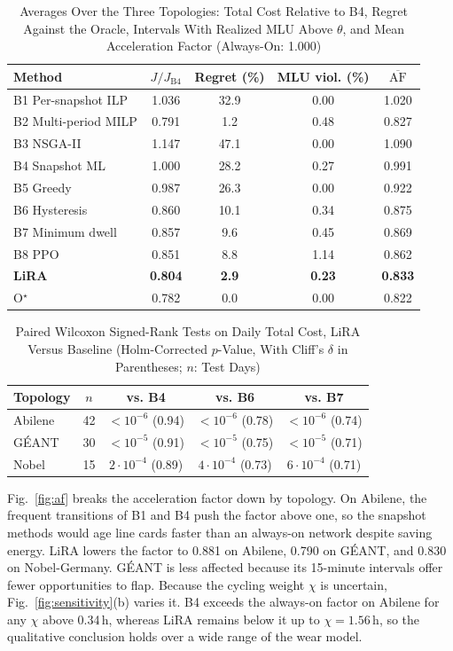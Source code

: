 \documentclass[journal]{IEEEtran}
\begin{document}
\begin{table}[t]
\centering
\caption{Averages Over the Three Topologies: Total Cost Relative to B4, Regret Against the Oracle, Intervals With Realized MLU Above $\theta$, and Mean Acceleration Factor (Always-On: 1.000)}
\label{tab:cost}
\footnotesize
\setlength{\tabcolsep}{4pt}
\begin{tabular}{@{}lcccc@{}}
\toprule
Method & $J/J_{\mathrm{B4}}$ & Regret (\%) & MLU viol. (\%) & $\overline{\mathrm{AF}}$ \\
\midrule
B1 Per-snapshot ILP & 1.036 & 32.9 & 0.00 & 1.020 \\
B2 Multi-period MILP & 0.791 & 1.2 & 0.48 & 0.827 \\
B3 NSGA-II & 1.147 & 47.1 & 0.00 & 1.090 \\
B4 Snapshot ML & 1.000 & 28.2 & 0.27 & 0.991 \\
B5 Greedy & 0.987 & 26.3 & 0.00 & 0.922 \\
B6 Hysteresis & 0.860 & 10.1 & 0.34 & 0.875 \\
B7 Minimum dwell & 0.857 & 9.6 & 0.45 & 0.869 \\
B8 PPO & 0.851 & 8.8 & 1.14 & 0.862 \\
\midrule
\textbf{LiRA} & \textbf{0.804} & \textbf{2.9} & \textbf{0.23} & \textbf{0.833} \\
O$^\star$ & 0.782 & 0.0 & 0.00 & 0.822 \\
\bottomrule
\end{tabular}
\end{table}

\begin{table}[t]
\centering
\caption{Paired Wilcoxon Signed-Rank Tests on Daily Total Cost, LiRA Versus Baseline (Holm-Corrected $p$-Value, With Cliff's $\delta$ in Parentheses; $n$: Test Days)}
\label{tab:stats}
\footnotesize
\setlength{\tabcolsep}{3pt}
\begin{tabular}{@{}lcccc@{}}
\toprule
Topology & $n$ & vs. B4 & vs. B6 & vs. B7 \\
\midrule
Abilene & 42 & $<10^{-6}$ (0.94) & $<10^{-6}$ (0.78) & $<10^{-6}$ (0.74) \\
G\'{E}ANT & 30 & $<10^{-5}$ (0.91) & $<10^{-5}$ (0.75) & $<10^{-5}$ (0.71) \\
Nobel & 15 & $2\cdot10^{-4}$ (0.89) & $4\cdot10^{-4}$ (0.73) & $6\cdot10^{-4}$ (0.71) \\
\bottomrule
\end{tabular}
\end{table}

Fig.~\ref{fig:af} breaks the acceleration factor down by topology. On Abilene, the frequent transitions of B1 and B4 push the factor above one, so the snapshot methods would age line cards faster than an always-on network despite saving energy. LiRA lowers the factor to 0.881 on Abilene, 0.790 on G\'{E}ANT, and 0.830 on Nobel-Germany. G\'{E}ANT is less affected because its 15-minute intervals offer fewer opportunities to flap. Because the cycling weight $\chi$ is uncertain, Fig.~\ref{fig:sensitivity}(b) varies it. B4 exceeds the always-on factor on Abilene for any $\chi$ above 0.34\,h, whereas LiRA remains below it up to $\chi=1.56$\,h, so the qualitative conclusion holds over a wide range of the wear model.
\end{document}
